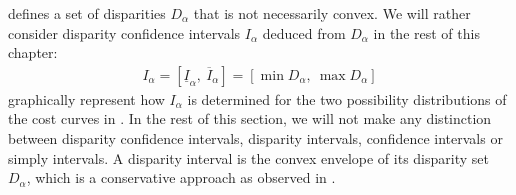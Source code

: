  defines a set of disparities $D_\alpha$ that is not necessarily convex. We will rather consider disparity confidence intervals $I_\alpha$ deduced from $D_\alpha$ in the rest of this chapter:
\begin{align}
    I_\alpha = [\underline{I}_\alpha,~\overline{I}_\alpha]=[\min D_\alpha, ~\max D_\alpha]\label{eq:confidence_disparity_intervals}
\end{align}
 graphically represent how $I_\alpha$ is determined for the two possibility distributions of the cost curves in . In the rest of this section, we will not make any distinction between disparity confidence intervals, disparity intervals, confidence intervals or simply intervals. A disparity interval is the convex envelope of its disparity set $D_\alpha$, which is a conservative approach as observed in .

